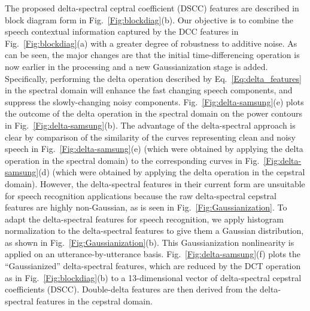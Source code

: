 \documentclass{article}
\begin{document}
The proposed  delta-spectral ceptral coefficient
(DSCC) features are described in block diagram form in Fig.~\ref{Fig:blockdiag}(b). Our objective is to combine the  speech contextual information   captured by the DCC features in Fig.~\ref{Fig:blockdiag}(a) with a greater degree of  robustness to additive noise. As can be seen, the major changes are that the initial time-differencing operation is now earlier in the processing and a new Gaussianization stage is added. Specifically, performing the delta operation described by Eq.~\eqref{Eq:delta_features}    in the spectral domain will enhance the fast changing speech components, and suppress the slowly-changing noisy components.  Fig.~\ref{Fig:delta-samsung}(e) plots the outcome  of the delta operation in the spectral domain on the power contours in Fig.~\ref{Fig:delta-samsung}(b).  The advantage of the delta-spectral approach is clear by comparison of the similarity of the  curves representing clean and noisy speech in Fig.~\ref{Fig:delta-samsung}(e) (which were obtained by applying the delta operation in the spectral domain) to the corresponding curves in Fig.~\ref{Fig:delta-samsung}(d) (which were obtained by applying the delta operation in the cepstral domain). However,  the delta-spectral features
in their current form are unsuitable for speech recognition applications because the raw delta-spectral cepstral features are highly non-Gaussian, as is seen in Fig.~\ref{Fig:Gaussianization}.  To adapt the delta-spectral features for  speech recognition, we apply histogram  normalization to the delta-spectral features to give them a Gaussian distribution, as shown in   Fig.~\ref{Fig:Gaussianization}(b). This Gaussianization nonlinearity is applied on  an utterance-by-utterance basis. Fig.~\ref{Fig:delta-samsung}(f) plots the ``Gaussianized'' delta-spectral features, which are   reduced by the DCT operation as in Fig.~\ref{Fig:blockdiag}(b) to a 13-dimensional vector of delta-spectral cepstral coefficients (DSCC). Double-delta features are then derived from the delta-spectral features in the cepstral domain.
\end{document}
